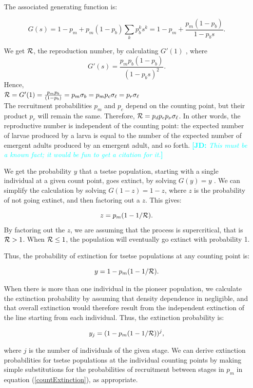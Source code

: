 \documentclass[smallextended]{svjour3}
\newcommand{\comment}[3]{\textcolor{#1}{\textbf{[#2: }\textit{#3}\textbf{]}}}
\newcommand{\jd}[1]{\comment{cyan}{JD}{#1}}
\begin{document}
The associated generating function  is:

$$G(s) = 1-p_m + p_m (1-p_b) \sum_k p_b^k s^k = 1-p_m + \frac{p_m (1-p_b)}{1-p_b s}.$$

We get ${\cal R}$, the reproduction number, by calculating $G'(1)$ \cite{bartlett1949some}, where $$G'(s) = \frac{p_m p_b (1-p_b)}{(1-p_b s)^2}.$$  Hence, \\

$ {\cal R}= G'(1) = \frac{p_m p_b}{(1-p_b)} = p_m \sigma_b = p_mp_c \sigma_\ell =  p_r\sigma_\ell$ \\

The recruitment probabilities $p_m$ and $p_c$ depend on the counting point, but their product $p_r$ will remain the same. Therefore, ${\cal R} =p_dp_ep_{\nu} \sigma_{\ell}$. In other words, the reproductive number is independent of the counting point: the expected number of larvae produced by a larva is equal to the number of the expected number of emergent adults produced by an emergent adult, and so forth.
\jd{This must be a known fact; it would be fun to get a citation for it.}

We get the probability $y$ that a tsetse population, starting with a single individual at a given count point, goes extinct, by solving $G(y) = y$ \cite{bartlett1949some}. We can simplify the calculation by solving   $G(1-z) = 1-z$, where $z$ is the probability of not going extinct, and then factoring out a $z$. This gives:

$$ z = p_m(1-1/{\cal R}).$$  
By factoring out the $z$, we are assuming that the process is supercritical, that is ${\cal R} > 1$. When ${\cal R} \leq 1$, the population will eventually go extinct with probability 1. 

Thus, the probability of extinction for tsetse populations at any counting point is:

\begin{equation}
	\label{countExtinction}	
	y = 1 - p_m(1-1/{\cal R}).	
\end{equation}

When there is more than one individual in the pioneer population, we calculate the extinction probability by assuming that density dependence in negligible, and that overall extinction would therefore result from the independent extinction of the line starting from each individual. Thus, the extinction probability is:

$$y_j = (1 - p_m(1-1/{\cal R}))^j,$$

where $j$ is the number of individuals of the given stage. We can derive extinction probabilities for tsetse populations at the individual counting points by making simple substitutions for the probabilities of recruitment  between stages in $p_m$  in equation (\ref{countExtinction}), as appropriate. 
\end{document}
